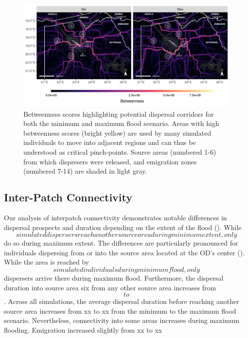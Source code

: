 \documentclass[abstract=on,10pt,a4paper,bibliography=totocnumbered]{article}
\begin{document}
\begin{figure}
  \begin{center}
  \includegraphics[width = \textwidth]{99_Betweenness.png}
  \caption{Betweenness scores highlighting potential dispersal corridors for
  both the minimum and maximum flood scenario. Areas with high betweenness
  scores (bright yellow) are used by many simulated individuals to move into
  adjacent regions and can thus be understood as critical pinch-points. Source
  areas (numbered 1-6) from which dispresers were released, and emigration zones
  (numbered 7-14) are shaded in light gray.}
  \label{Betweenness}
  \end{center}
\end{figure}

\subsection{Inter-Patch Connectivity}
Our analysis of interpatch connectivity demonstrates notable differences in
dispersal prospects and duration depending on the extent of the flood
(). While $$ simulated
dispersers reach another source area during minimum extent, only
$$ do so during maximum extent. The
differences are particularly pronounced for individuals dispersing from or into
the source area located at the OD's center (). While the area
is reached by $$ simulated individuals
during minimum flood, only $$
dispersers arrive there during maximum flood. Furthermore, the dispersal
duration into source area six from any other source area increases from
$$ to
$$. Across all simulations, the
average dispersal duration before reaching another source area increases from xx
to xx from the minimum to the maximum flood scenario. Nevertheless, connectivity
into some areas increases during maximum flooding. Emigration increased slightly
from xx to xx
\end{document}
